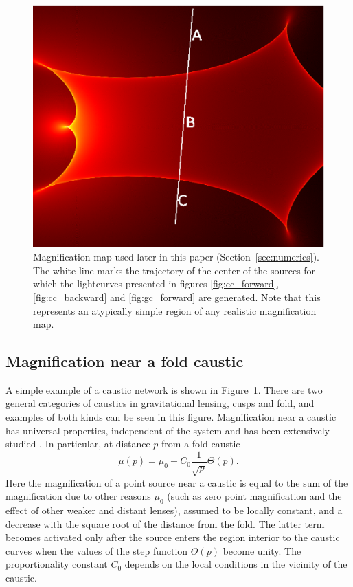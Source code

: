 \documentclass[usenatbib]{mn2e}
\begin{document}
\begin{figure}
\centering
\includegraphics[width=0.9\hsize]{figures/IRIS567_path.eps}
\caption{\label{fig:magnification_map} Magnification map used later in
  this paper (Section~\ref{sec:numerics}). The white line marks the
  trajectory of the center of the sources for which the lightcurves
  presented in figures \ref{fig:cc_forward}, \ref{fig:cc_backward} and \ref{fig:gc_forward} are generated.  Note that this represents an
  atypically simple region of any realistic magnification map.}
\end{figure}


\subsection{Magnification near a fold caustic}

A simple example of a caustic network is shown in
Figure~\ref{fig:magnification_map}.  There are two general categories
of caustics in gravitational lensing, cusps and fold, and examples of
both kinds can be seen in this figure.  Magnification near a caustic
has universal properties, independent of the system and has been
extensively studied
\citep{1986ApJ...310..568B,1992A&A...260....1S,2002ApJ...574..970G,2002ApJ...580..468G}.
In particular, at distance $p$ from a fold caustic
\begin {equation}
 \mu(p) = \mu_0 + C_0 \frac{1}{\sqrt{p}} \Theta(p).
\end {equation}
Here the magnification of a point source near a caustic is equal to
the sum of the magnification due to other reasons $\mu_0$ 
(such as zero point magnification and the effect of other weaker and 
distant lenses), assumed to
be locally constant, and a decrease with the square root of the
distance from the fold. The latter term becomes activated only after
the source enters the region interior to the caustic curves when the
values of the step function $\Theta(p)$ become unity. The
proportionality constant $C_0$ depends on the local conditions in the
vicinity of the caustic.
\end{document}
